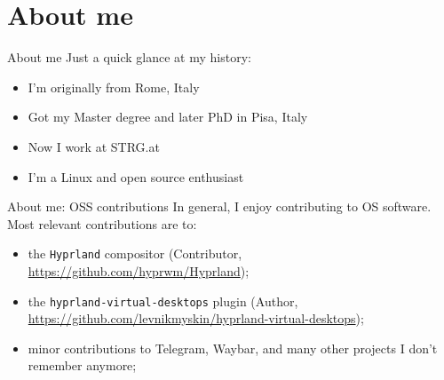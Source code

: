 \documentclass[aspectratio=169,xcolor={dvipsnames}]{beamer}
\begin{document}
  \begin{frame}[plain]
    
  \end{frame}

  \section{About me }
  \begin{frame}{About me}
    Just a quick glance at my history:
    \begin{itemize}
      \item I'm originally from Rome, Italy 
      \item Got my Master degree and later PhD in Pisa, Italy 
      \item Now I work at STRG.at 
      \item I'm a Linux and open source enthusiast 
    \end{itemize}
  \end{frame}

  \begin{frame}{About me: OSS contributions}
    In general, I enjoy contributing to OS software. Most relevant contributions are to:
    \begin{itemize}
      \item the \texttt{Hyprland} compositor (Contributor, \url{https://github.com/hyprwm/Hyprland});
      \item the \texttt{hyprland-virtual-desktops} plugin (Author, \url{https://github.com/levnikmyskin/hyprland-virtual-desktops});
      \item minor contributions to Telegram, Waybar, and many other projects I don't remember anymore;
    \end{itemize}
  \end{frame}
\end{document}
